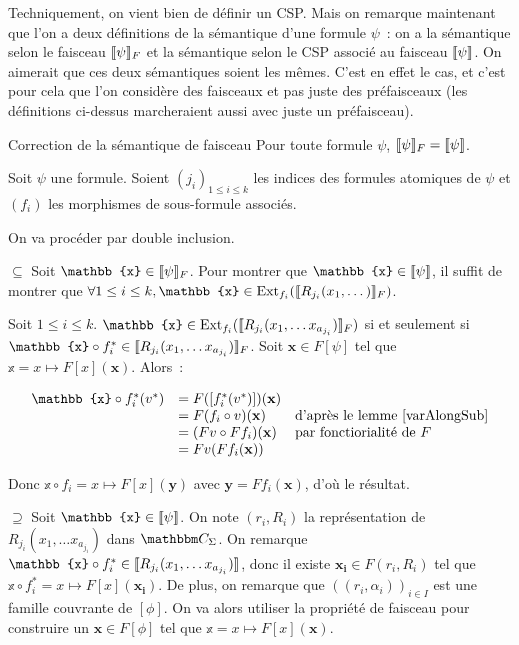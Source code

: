 Techniquement, on vient bien de définir un CSP. Mais on remarque maintenant que l'on a
deux définitions de la sémantique d'une formule $\psi$~: on a la sémantique selon le
faisceau $\llbracket {\psi} \rrbracket_F$ et la sémantique selon le CSP associé au faisceau $\llbracket {\psi} \rrbracket$.
On aimerait que ces deux sémantiques soient les mêmes. C'est en effet le cas, et c'est pour
cela que l'on considère des faisceaux et pas juste des préfaisceaux (les définitions
ci-dessus marcheraient aussi avec juste un préfaisceau).

\begin{theo}{Correction de la sémantique de faisceau}\label{shSemCorrect}
    Pour toute formule $\psi$, $\llbracket {\psi} \rrbracket_F = \llbracket {\psi} \rrbracket$.
\end{theo}

\begin{pv}
    Soit $\psi$ une formule.
    Soient $(j_i)_{1\leq i\leq k}$ les indices des formules atomiques de $\psi$
    et $(f_i)$ les morphismes de sous-formule associés.

    On va procéder par double inclusion.

    $\boxed{\subseteq}$ Soit $\mathbb{x}\in\sem{\psi}_F$.  Pour montrer que
    $\mathbb{x}\in\sem{\psi}$, il suffit de montrer que $\forall 1\leq i\leq k,
    \mathbb{x}\in\ext_{f_i}(\sem{R_{j_i}(x_1,\dots)}_F)$.

    Soit $1\leq i\leq k$. $\mathbb{x}\in\ext_{f_i}(\sem{R_{j_i}(x_1,\dots
    x_{a_{j_i}})}_F)$ si et seulement si $\mathbb{x}\circ f_i^*\in\sem{R_{j_i}(x_1,\dots
    x_{a_{j_i}})}_F$. Soit $\mathbf{x}\in F[\psi]$ tel que
    $\mathbb{x} = x\mapsto F[x](\mathbf{x})$.
    Alors~:
    
    \[\begin{array}{rll}
        \mathbb{x}\circ f_i^*(v^*) &= F([f_i^*(v^*)])(\mathbf{x}) & \\
         &= F(f_i\circ v)(\mathbf{x})
             & \text{d'après le lemme \ref{varAlongSub}} \\
         &= (Fv\circ Ff_i)(\mathbf{x}) & \text{par fonctiorialité de } F\\
         &= Fv(Ff_i(\mathbf{x})) & \\
    \end{array}\]

    Donc $\mathbb{x}\circ f_i = x\mapsto F[x](\mathbf{y})$ 
    avec $\mathbf{y} = Ff_i(\mathbf{x})$, d'où le résultat.

    $\boxed{\supseteq}$ Soit $\mathbb{x}\in\sem{\psi}$. On note $(r_i,R_i)$ la
    représentation de $R_{j_i}(x_1,\dots x_{a_{j_i}})$ dans $\C_\Sigma$. On
    remarque $\mathbb{x}\circ f_i^*\in\sem{R_{j_i}(x_1,\dots x_{a_{j_i}})}$, donc il existe
    $\mathbf{x_i}\in F(r_i,R_i)$ tel que
    $\mathbb{x}\circ f_i^* = x\mapsto F[x](\mathbf{x_i})$. De plus, on remarque que
    $((r_i,\alpha_i))_{i\in I}$ est une famille couvrante de $[\phi]$. On va alors utiliser
    la propriété de faisceau pour construire un $\mathbf{x}\in F[\phi]$ tel que
    $\mathbb{x} = x\mapsto F[x](\mathbf{x})$.


\end{pv}
